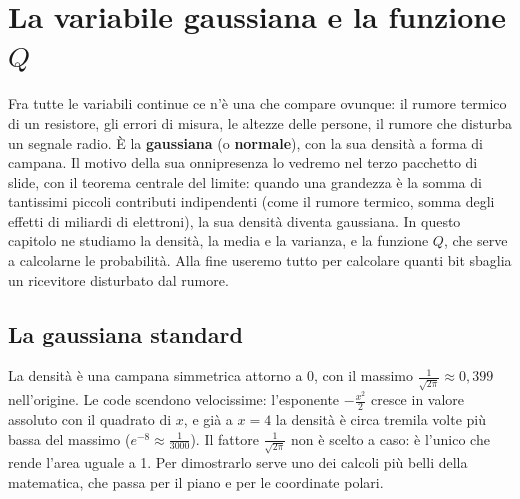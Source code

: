 \chapter{La variabile gaussiana e la funzione \texorpdfstring{$Q$}{Q}}

Fra tutte le variabili continue ce n'è una che compare ovunque: il rumore termico di un resistore, gli errori di
misura, le altezze delle persone, il rumore che disturba un segnale radio. È la \textbf{gaussiana} (o \textbf{normale}),
con la sua densità a forma di campana. Il motivo della sua onnipresenza lo vedremo nel terzo pacchetto di slide, con il
teorema centrale del limite: quando una grandezza è la somma di tantissimi piccoli contributi indipendenti (come il
rumore termico, somma degli effetti di miliardi di elettroni), la sua densità diventa gaussiana. In questo capitolo ne
studiamo la densità, la media e la varianza, e la funzione $Q$, che serve a calcolarne le probabilità. Alla fine
useremo tutto per calcolare quanti bit sbaglia un ricevitore disturbato dal rumore.

\section{La gaussiana standard}


La densità è una campana simmetrica attorno a 0, con il massimo $\frac{1}{\sqrt{2\pi}} \approx 0{,}399$ nell'origine.
Le code scendono velocissime: l'esponente $-\frac{x^2}{2}$ cresce in valore assoluto con il quadrato di $x$, e già a
$x = 4$ la densità è circa tremila volte più bassa del massimo ($e^{-8} \approx \frac{1}{3000}$). Il fattore $\frac{1}{\sqrt{2\pi}}$ non è scelto a caso: è
l'unico che rende l'area uguale a 1. Per dimostrarlo serve uno dei calcoli più belli della matematica, che passa per il
piano e per le coordinate polari.


